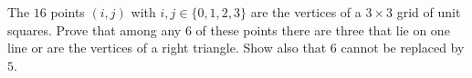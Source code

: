 The $16$ points $(i,j)$ with $i,j\in\{0,1,2,3\}$ are the vertices of a $3\times3$ grid of unit squares. Prove that among any $6$ of these points there are three that lie on one line or are the vertices of a right triangle. Show also that $6$ cannot be replaced by $5$.
